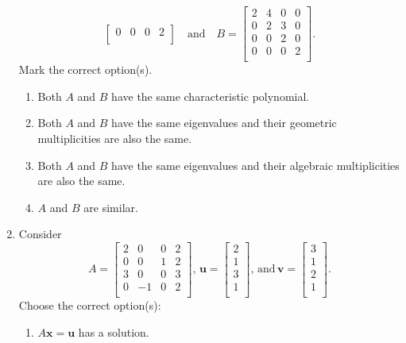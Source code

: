 \documentclass[12pt]{article}
\begin{document}
\begin{enumerate}[leftmargin=*]
\begin{equation*}
\begin{bmatrix}
	 		0 & 0 & 0 & 2 \\
	 	\end{bmatrix}
	 	\quad\text{and}\quad 
	 	B = \begin{bmatrix}
	 		2 & 4 & 0 & 0 \\
	 		0 & 2 & 3 & 0 \\
	 		0 & 0 & 2 & 0 \\
	 		0 & 0 & 0 & 2 \\
	 	\end{bmatrix}.
	 \end{equation*}
	 Mark the correct option(s).
	 \begin{enumerate}
	 	\item Both $A$ and $B$ have the same characteristic polynomial.
	 	\item Both $A$ and $B$ have the same eigenvalues and their geometric multiplicities are also the same.
	 	\item Both $A$ and $B$ have the same eigenvalues and their algebraic multiplicities are also the same.
	 	\item $A$ and $B$ are similar.
	 \end{enumerate}
	 \item Consider
	 \begin{equation*} 
	 	A = 
	 	\begin{bmatrix}
	 		2 & 0 & 0 & 2 \\
	 		0 & 0 & 1 & 2 \\
	 		3 & 0 & 0 & 3 \\
	 		0 & -1 & 0 & 2 \\
	 	\end{bmatrix},
	 	\, 
	 	\mathbf{u} = 
	 	\begin{bmatrix}
	 		2 \\
	 		1 \\
	 		3 \\
	 		1 \\
	 	\end{bmatrix}, 
	 	\, \text{and} \, 
	 	\mathbf{v} = 
	 	\begin{bmatrix}
	 		3 \\
	 		1 \\
	 		2 \\
	 		1 \\
	 	\end{bmatrix}.
	 \end{equation*}
	 Choose the correct option(s):
	 \begin{enumerate}
	 	\item $A \mathbf{x} = \mathbf{u}$ has a solution.

\end{enumerate}
\end{enumerate}
\end{document}
